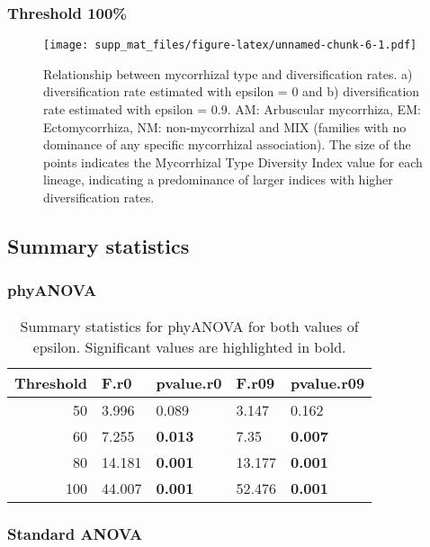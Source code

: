 \documentclass[]{article}
\begin{document}
\hypertarget{threshold-100}{%
\subsubsection{Threshold 100\%}\label{threshold-100}}

\begin{figure}
\centering
\texttt{[image: supp\_mat\_files/figure-latex/unnamed-chunk-6-1.pdf]}
\caption{Relationship between mycorrhizal type and diversification
rates. a) diversification rate estimated with epsilon = 0 and b)
diversification rate estimated with epsilon = 0.9. AM: Arbuscular
mycorrhiza, EM: Ectomycorrhiza, NM: non-mycorrhizal and MIX (families
with no dominance of any specific mycorrhizal association). The size of
the points indicates the Mycorrhizal Type Diversity Index value for each
lineage, indicating a predominance of larger indices with higher
diversification rates.}
\end{figure}

\pagebreak

\hypertarget{summary-statistics}{%
\subsection{Summary statistics}\label{summary-statistics}}

\hypertarget{phyanova}{%
\subsubsection{phyANOVA}\label{phyanova}}

\begin{table}[H]

\caption{\label{tab:unnamed-chunk-7}Summary statistics for phyANOVA for both values of epsilon. Significant values are highlighted in bold.}
\centering
\begin{tabular}{r|l|l|l|l}
\hline
Threshold & F.r0 & pvalue.r0 & F.r09 & pvalue.r09\\
\hline
50 & 3.996 & 0.089 & 3.147 & 0.162\\
\hline
60 & 7.255 & \textbf{0.013} & 7.35 & \textbf{0.007}\\
\hline
80 & 14.181 & \textbf{0.001} & 13.177 & \textbf{0.001}\\
\hline
100 & 44.007 & \textbf{0.001} & 52.476 & \textbf{0.001}\\
\hline
\end{tabular}
\end{table}

\hypertarget{standard-anova}{%
\subsubsection{Standard ANOVA}\label{standard-anova}}
\end{document}
